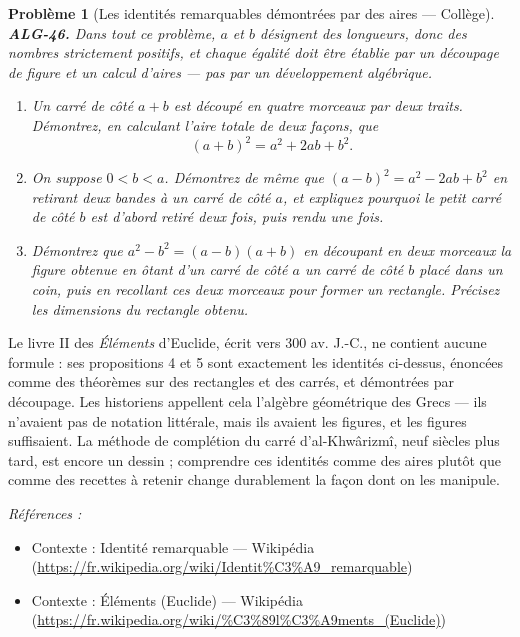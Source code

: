\documentclass[11pt]{article}
\newtheorem{problem}{Problème}
\newenvironment{refs}{\par\small\noindent\emph{Références :}\begin{itemize}\setlength\itemsep{0pt}}{\end{itemize}\normalsize}
\begin{document}
\begin{problem}[{Les identités remarquables démontrées par des aires --- Collège}]
\textbf{ALG-46.} Dans tout ce problème, $ a $ et $ b $ désignent des longueurs, donc des
nombres strictement positifs, et chaque égalité doit être établie par un découpage de figure et un
calcul d'aires --- pas par un développement algébrique.
\begin{enumerate}
\item[(a)] Un carré de côté $ a+b $ est découpé en quatre morceaux par deux traits. Démontrez, en
calculant l'aire totale de deux façons, que
\[ (a+b)^2 = a^2 + 2ab + b^2 . \]
\item[(b)] On suppose $ 0 < b < a $. Démontrez de même que $ (a-b)^2 = a^2 - 2ab + b^2 $ en
retirant deux bandes à un carré de côté $ a $, et expliquez pourquoi le petit carré de côté
$ b $ est d'abord retiré deux fois, puis rendu une fois.
\item[(c)] Démontrez que $ a^2 - b^2 = (a-b)(a+b) $ en découpant en deux morceaux la figure obtenue en
ôtant d'un carré de côté $ a $ un carré de côté $ b $ placé dans un coin, puis en recollant ces
deux morceaux pour former un rectangle. Précisez les dimensions du rectangle obtenu.
\end{enumerate}

\end{problem}

\noindent Le livre II des \textit{Éléments} d'Euclide, écrit vers 300 av. J.-C., ne contient
aucune formule : ses propositions 4 et 5 sont exactement les identités ci-dessus, énoncées comme
des théorèmes sur des rectangles et des carrés, et démontrées par découpage. Les historiens
appellent cela l'algèbre géométrique des Grecs --- ils n'avaient pas de notation littérale, mais ils
avaient les figures, et les figures suffisaient. La méthode de complétion du carré d'al-Khwârizmî,
neuf siècles plus tard, est encore un dessin ; comprendre ces identités comme des aires plutôt que
comme des recettes à retenir change durablement la façon dont on les manipule.

\begin{refs}
\item Contexte : Identité remarquable --- Wikipédia (\url{https://fr.wikipedia.org/wiki/Identit%C3%A9_remarquable})
\item Contexte : Éléments (Euclide) --- Wikipédia (\url{https://fr.wikipedia.org/wiki/%C3%89l%C3%A9ments_(Euclide)})
\end{refs}

\bigskip
\end{document}
